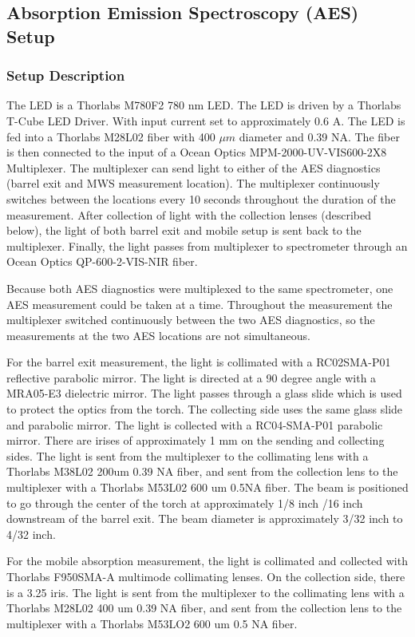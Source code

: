 \clearpage
\subsection{Absorption Emission Spectroscopy (AES) Setup}

\subsubsection{Setup Description}

The LED is a Thorlabs M780F2 780 nm LED. The LED is driven by a Thorlabs T-Cube LED Driver. With input current set to approximately 0.6 A. The LED is fed into a Thorlabs M28L02 fiber with 400 $\mu m$ diameter and 0.39 NA. The fiber is then connected to the input of a  Ocean Optics MPM-2000-UV-VIS600-2X8 Multiplexer.  The multiplexer can send light to either of the AES diagnostics (barrel exit and MWS measurement location). The multiplexer continuously switches between the locations every 10 seconds throughout the duration of the measurement. After collection of light with the collection lenses (described below), the light of both barrel exit and mobile setup is sent back to the multiplexer. Finally, the light passes from multiplexer to spectrometer through an Ocean Optics QP-600-2-VIS-NIR fiber.

Because both AES diagnostics were multiplexed to the same spectrometer, one AES measurement could be taken at a time. Throughout the measurement the multiplexer switched continuously between the two AES diagnostics, so the measurements at the two AES locations are not simultaneous.

For the barrel exit measurement, the light is collimated with a RC02SMA-P01 reflective parabolic mirror. The light is directed at a 90 degree angle with a MRA05-E3 dielectric mirror. The light passes through a glass slide which is used to protect the optics from the torch. The collecting side uses the same glass slide and parabolic mirror. The light is collected with a RC04-SMA-P01 parabolic mirror. There are irises of approximately 1 mm on the sending and collecting sides. The light is sent from the multiplexer to the collimating lens with a Thorlabs M38L02 200um 0.39 NA fiber, and sent from the collection lens to the multiplexer with a Thorlabs M53L02 600 um 0.5NA fiber. The beam is positioned to go through the center of the torch at approximately 1/8 inch /16 inch downstream of the barrel exit. The beam diameter is approximately 3/32 inch to 4/32 inch. 

For the mobile absorption measurement, the light is collimated and collected with Thorlabs F950SMA-A multimode collimating lenses.  On the collection side, there is a 3.25  iris. The light is sent from the multiplexer to the collimating lens with a Thorlabs M28L02 400 um 0.39 NA fiber, and sent from the collection lens to the multiplexer with a Thorlabs M53LO2 600 um 0.5 NA fiber. 

